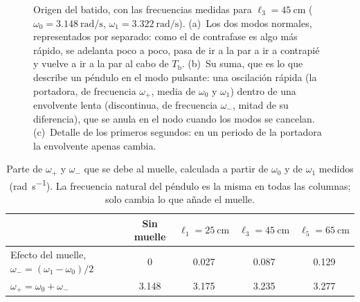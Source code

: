\documentclass[a4paper,11pt]{amsart}
\numberwithin{equation}{section}
\newcommand{\Tb}{T_{\mathrm{b}}}              %
\newcommand{\Tp}{T_{+}}                       %
\newcommand{\wz}{\omega_0}                    %
\newcommand{\wu}{\omega_1}                    %
\newcommand{\wm}{\omega_{-}}                  %
\newcommand{\wpl}{\omega_{+}}                 %
\theoremstyle{cienplano}
\theoremstyle{ciendef}
\theoremstyle{cienobs}
\begin{document}
\begin{figure}[ht]
\caption{Origen del batido, con las frecuencias medidas para
$\ell_3=\SI{45}{\centi\meter}$ ($\wz=\SI{3,148}{\radian\per\second}$,
$\wu=\SI{3,322}{\radian\per\second}$). (a)~Los dos modos normales, representados
por separado: como el de contrafase es algo más rápido, se adelanta poco a
poco, pasa de ir a la par a ir a contrapié y vuelve a ir a la par al cabo de
$\Tb$. (b)~Su suma, que es lo que describe un péndulo en el modo pulsante: una
oscilación rápida (la portadora, de frecuencia $\wpl$, media de $\wz$ y $\wu$)
dentro de una envolvente lenta (discontinua, de frecuencia $\wm$, mitad de su
diferencia), que se anula en el nodo cuando los modos se cancelan.
(c)~Detalle de los primeros segundos: en un periodo de la portadora la
envolvente apenas cambia.}
\label{fig:batido}
\end{figure}

\begin{table}[ht]
\centering
\caption{Parte de $\wpl$ y $\wm$ que se debe al muelle, calculada a partir de
$\wz$ y de $\wu$ medidos (\si{\radian\per\second}). La frecuencia natural del
péndulo es la misma en todas las columnas; solo cambia lo que añade el
muelle.}
\label{tab:efecto}
\renewcommand{\arraystretch}{1.25}
\begin{tabular}{@{}l c c c c@{}}
\toprule
 & Sin muelle & $\ell_1=\SI{25}{\centi\meter}$ & $\ell_3=\SI{45}{\centi\meter}$ & $\ell_5=\SI{65}{\centi\meter}$ \\
\midrule
Efecto del muelle, $\wm=(\wu-\wz)/2$ & \num{0}     & \num{0,027} & \num{0,087} & \num{0,129} \\
$\wpl=\wz+\wm$                        & \num{3,148} & \num{3,175} & \num{3,235} & \num{3,277} \\
\bottomrule
\end{tabular}
\end{table}
\end{document}
